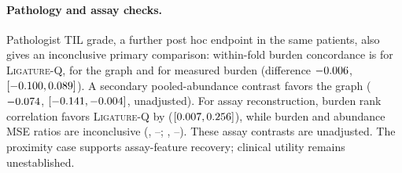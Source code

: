 \documentclass[10pt,letterpaper]{article}
\theoremstyle{definition}
\theoremstyle{remark}
\newcommand{\method}{\textnormal{\textsc{Ligature}}}
\begin{document}
\paragraph{Pathology and assay checks.} Pathologist TIL grade, a further post hoc endpoint in the same patients, also gives an inconclusive primary comparison: within-fold burden concordance is \CliTilLig{} for \method{}-Q, \CliTilDirect{} for the graph and \CliTilMeasured{} for measured burden (difference $-0.006$, $[-0.100,0.089]$). A secondary pooled-abundance contrast favors the graph ($-0.074$, $[-0.141,-0.004]$, unadjusted). For assay reconstruction, burden rank correlation favors \method{}-Q by \CliRho{} ($[0.007,0.256]$), while burden and abundance MSE ratios are inconclusive (\CliBurdenMse{}, \CliBurdenMseLo--\CliBurdenMseHi; \CliAbundMse{}, \CliAbundMseLo--\CliAbundMseHi). These assay contrasts are unadjusted. The proximity case supports assay-feature recovery; clinical utility remains unestablished.
\end{document}
